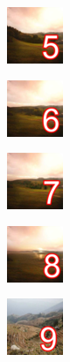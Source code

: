 \begin{code}
\begin{gridlayout}{\textwidth}{12cm}
        \begin{row}{0.33}
            \begin{cell}{0.25}
                \centering
                \includegraphics[width=0.9\cellwidth]{doc-one/img/thumbnail-5.png}
            \end{cell}
            \begin{cell}{0.25}
                \centering
                \includegraphics[width=0.9\cellwidth]{doc-one/img/thumbnail-6.png}
            \end{cell}
            \begin{cell}{0.25}
                \centering
                \includegraphics[width=0.9\cellwidth]{doc-one/img/thumbnail-7.png}
            \end{cell}
            \begin{cell}{0.25}
                \centering
                \includegraphics[width=0.9\cellwidth]{doc-one/img/thumbnail-8.png}
            \end{cell}
        \end{row}
        \begin{row}{0.34}
            \begin{cell}{0.25}
                \centering
                \includegraphics[width=0.9\cellwidth]{doc-one/img/thumbnail-9.png}
            \end{cell}
            \begin{cell}{0.25}

\end{cell}
\end{row}
\end{gridlayout}
\end{code}
